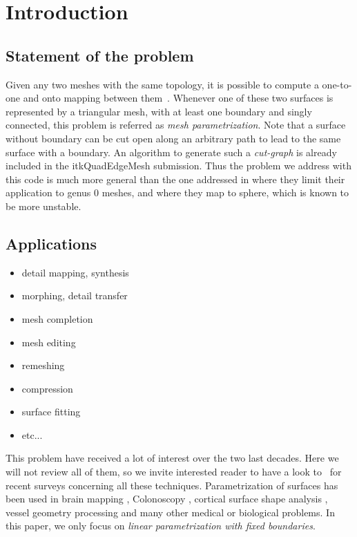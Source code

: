 \documentclass{InsightArticle}
\begin{document}
\tableofcontents

\section{Introduction}
\subsection{Statement of the problem}

Given any two meshes with the same topology, it is possible to compute a one-to-one and onto mapping between them~\cite{Hormann:2007:MPT}. Whenever one of these two surfaces is represented by a triangular mesh, with at least one boundary and singly connected, this problem is referred as \emph{mesh parametrization}. Note that a surface without boundary can be cut open along an arbitrary path to lead to the same surface with a boundary. An algorithm to generate such a \emph{cut-graph} is already included in the itkQuadEdgeMesh \cite{itkQE} submission. Thus the problem we address with this code is much more general than the one addressed in \cite{Haker00a,Haker00b,Angenent99,Gao06} where they limit their application to genus 0 meshes, and where they map to sphere, which is known to be more unstable.

\subsection{Applications}
\begin{itemize}
    \item detail mapping, synthesis
    \item morphing, detail transfer
    \item mesh completion
    \item mesh editing
    \item remeshing
    \item compression
    \item surface fitting
    \item etc...
\end{itemize}

This problem have received a lot of interest over the two last decades. Here we will not review all of them, so we invite interested reader to have a look to~\cite{Floater:2005:SPA,Sheffer06:Survey,Hormann:2007:MPT} for recent surveys concerning all these techniques. Parametrization of surfaces has been used in brain mapping \cite{Gu04}, Colonoscopy \cite{Gu06},  cortical surface shape analysis \cite{Yu07}, vessel geometry processing and many other medical or biological problems. In this paper, we only focus on \emph{linear parametrization with fixed boundaries}.
\end{document}
